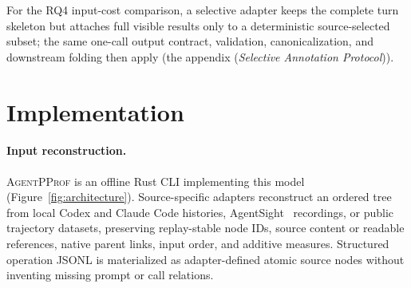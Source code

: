 \documentclass[letterpaper]{article}
\newcommand{\sys}{\textsc{AgentPProf}\xspace}
\begin{document}
For the RQ4 input-cost comparison, a selective adapter keeps the complete
turn skeleton but attaches full visible results only to a deterministic
source-selected subset; the same one-call output contract, validation,
canonicalization, and downstream folding then apply
(the appendix (\emph{Selective Annotation Protocol})).

\section{Implementation}
\label{sec:impl}

\paragraph{Input reconstruction.}
\sys is an offline Rust CLI implementing this model
(Figure~\ref{fig:architecture}). Source-specific adapters reconstruct an
ordered tree from local Codex and Claude Code histories,
AgentSight~\cite{agentsight} recordings, or public trajectory datasets,
preserving replay-stable node IDs, source content or readable references,
native parent links, input order, and additive measures. Structured operation
JSONL is materialized as adapter-defined atomic source nodes without inventing
missing prompt or call relations.
\end{document}
